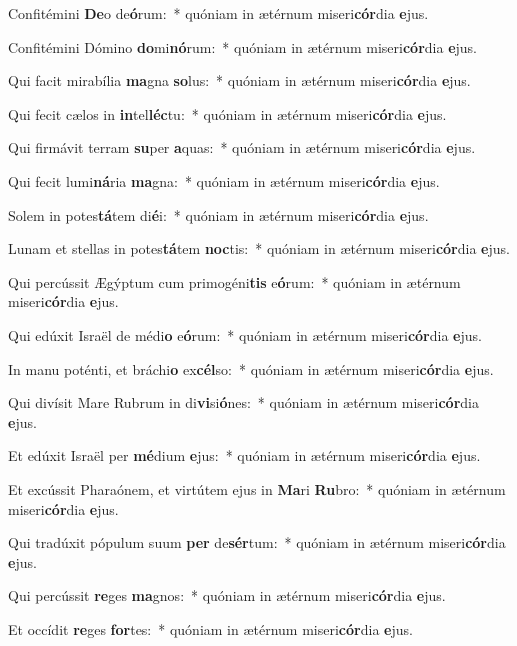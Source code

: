 \item Confitémini \textbf{De}o de\textbf{ó}rum:~* quóniam in ætérnum miseri\textbf{cór}dia \textbf{e}jus.
\item Confitémini Dómino \textbf{do}mi\textbf{nó}rum:~* quóniam in ætérnum miseri\textbf{cór}dia \textbf{e}jus.
\item Qui facit mirabília \textbf{ma}gna \textbf{so}lus:~* quóniam in ætérnum miseri\textbf{cór}dia \textbf{e}jus.
\item Qui fecit cælos in \textbf{in}tel\textbf{léc}tu:~* quóniam in ætérnum miseri\textbf{cór}dia \textbf{e}jus.
\item Qui firmávit terram \textbf{su}per \textbf{a}quas:~* quóniam in ætérnum miseri\textbf{cór}dia \textbf{e}jus.
\item Qui fecit lumi\textbf{ná}ria \textbf{ma}gna:~* quóniam in ætérnum miseri\textbf{cór}dia \textbf{e}jus.
\item Solem in potes\textbf{tá}tem di\textbf{é}i:~* quóniam in ætérnum miseri\textbf{cór}dia \textbf{e}jus.
\item Lunam et stellas in potes\textbf{tá}tem \textbf{noc}tis:~* quóniam in ætérnum miseri\textbf{cór}dia \textbf{e}jus.
\item Qui percússit Ægýptum cum primogéni\textbf{tis} e\textbf{ó}rum:~* quóniam in ætérnum miseri\textbf{cór}dia \textbf{e}jus.
\item Qui edúxit Israël de médi\textbf{o} e\textbf{ó}rum:~* quóniam in ætérnum miseri\textbf{cór}dia \textbf{e}jus.
\item In manu poténti, et bráchi\textbf{o} ex\textbf{cél}so:~* quóniam in ætérnum miseri\textbf{cór}dia \textbf{e}jus.
\item Qui divísit Mare Rubrum in di\textbf{vi}si\textbf{ó}nes:~* quóniam in ætérnum miseri\textbf{cór}dia \textbf{e}jus.
\item Et edúxit Israël per \textbf{mé}dium \textbf{e}jus:~* quóniam in ætérnum miseri\textbf{cór}dia \textbf{e}jus.
\item Et excússit Pharaónem, et virtútem ejus in \textbf{Ma}ri \textbf{Ru}bro:~* quóniam in ætérnum miseri\textbf{cór}dia \textbf{e}jus.
\item Qui tradúxit pópulum suum \textbf{per} de\textbf{sér}tum:~* quóniam in ætérnum miseri\textbf{cór}dia \textbf{e}jus.
\item Qui percússit \textbf{re}ges \textbf{ma}gnos:~* quóniam in ætérnum miseri\textbf{cór}dia \textbf{e}jus.
\item Et occídit \textbf{re}ges \textbf{for}tes:~* quóniam in ætérnum miseri\textbf{cór}dia \textbf{e}jus.
